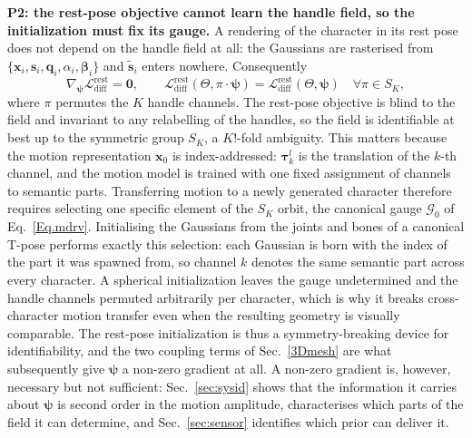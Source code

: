 \documentclass[lettersize,journal]{IEEEtran}
\newcommand{\rev}[1]{{\color{red}#1}}
\begin{document}
\textbf{P2: the rest-pose objective cannot learn the handle field, so the initialization must
fix its gauge.} A rendering of the character in its rest pose does not depend on the handle
field at all: the Gaussians are rasterised from $\{\mathbf{x}_i,\mathbf{s}_i,\mathbf{q}_i,
\alpha_i,\bm{\beta}_i\}$ and $\tilde{\bm{s}}_{i}$ enters nowhere. Consequently
\begin{equation} \label{Eq.gauge}
\nabla_{\bm{\psi}}\mathcal{L}^{\text{rest}}_{\text{diff}}=\bm{0},
\qquad
\mathcal{L}^{\text{rest}}_{\text{diff}}(\Theta,\pi\!\cdot\!\bm{\psi})=
\mathcal{L}^{\text{rest}}_{\text{diff}}(\Theta,\bm{\psi})
\quad \forall\pi\in S_{K},
\end{equation}
where $\pi$ permutes the $K$ handle channels. The rest-pose objective is blind to the field
and invariant to any relabelling of the handles, so the field is identifiable at best up to
the symmetric group $S_{K}$, a $K!$-fold ambiguity. This matters because the motion
representation $\bm{x}_{0}$ is index-addressed: $\bm{\tau}^{l}_{k}$ is the translation of the
$k$-th channel, and the motion model is trained with one fixed assignment of channels to
semantic parts. Transferring motion to a newly generated character therefore requires
selecting one specific element of the $S_{K}$ orbit, the canonical gauge $\mathcal{G}_{0}$ of
Eq.~\ref{Eq.mdrv}. Initialising the Gaussians from the joints and bones of a canonical T-pose
performs exactly this selection: each Gaussian is born with the index of the part it was
spawned from, so channel $k$ denotes the same semantic part across every character. A
spherical initialization leaves the gauge undetermined and the handle channels permuted
arbitrarily per character, which is why it breaks cross-character motion transfer even when
the resulting geometry is visually comparable. The rest-pose initialization is thus a
symmetry-breaking device for identifiability, and the two coupling terms of
Sec.~\ref{3Dmesh} are what subsequently give $\bm{\psi}$ a non-zero gradient at all.
\rev{A non-zero gradient is, however, necessary but not sufficient: Sec.~\ref{sec:sysid} shows
that the information it carries about $\bm{\psi}$ is second order in the motion amplitude,
characterises which parts of the field it can determine, and Sec.~\ref{sec:sensor} identifies
which prior can deliver it.}
\end{document}
